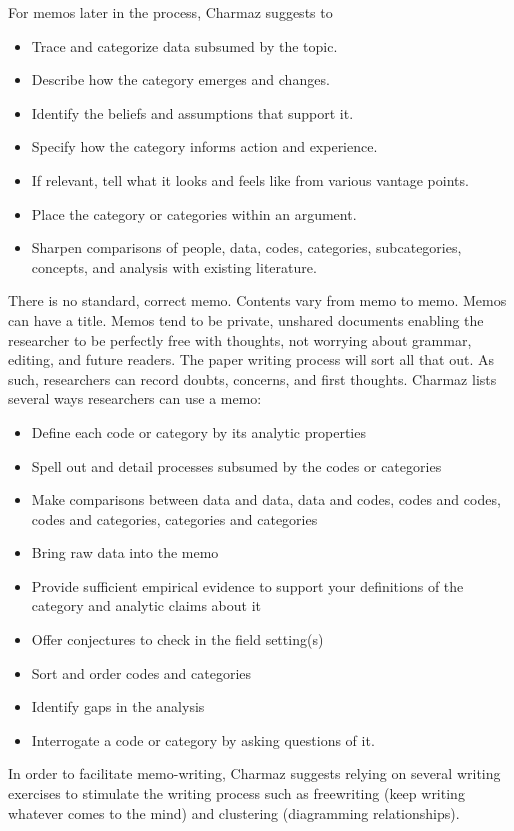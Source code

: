 For memos later in the process, Charmaz suggests to
\begin{itemize}
\item Trace and categorize data subsumed by the topic.
\item Describe how the category emerges and changes. 
\item Identify the beliefs and assumptions that support it. 
\item Specify how the category informs action and experience. 
\item If relevant, tell what it looks and feels like from various vantage points. 
\item Place the category or categories within an argument. 
\item Sharpen comparisons of people, data, codes, categories, subcategories, concepts, and analysis with existing literature. \cite{Charmaz}
\end{itemize}

There is no standard, correct memo. Contents vary from memo to memo. Memos can have a title. Memos tend to be private, unshared documents enabling the researcher to be perfectly free with thoughts, not worrying about grammar, editing, and future readers. The paper writing process will sort all that out. As such, researchers can record doubts, concerns, and first thoughts. Charmaz lists several ways researchers can use a memo:
\begin{itemize}
\item Define each code or category by its analytic properties
\item Spell out and detail processes subsumed by the codes or categories
\item Make comparisons between data and data, data and codes, codes and codes, codes and categories, categories and categories
\item Bring raw data into the memo
\item Provide sufficient empirical evidence to support your definitions of the category and analytic claims about it
\item Offer conjectures to check in the field setting(s)
\item Sort and order codes and categories
\item Identify gaps in the analysis
\item Interrogate a code or category by asking questions of it. \cite{Charmaz}
\end{itemize}

In order to facilitate memo-writing, Charmaz suggests relying on several writing exercises to stimulate the writing process such as freewriting (keep writing whatever comes to the mind) and clustering (diagramming relationships).

